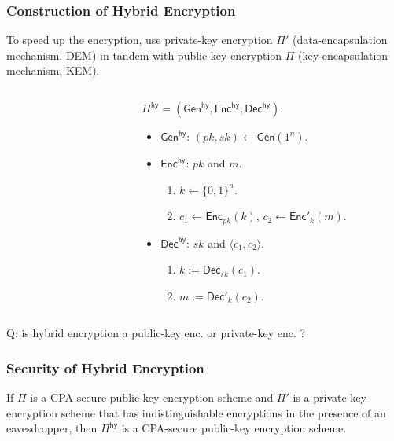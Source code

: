 \begin{frame}\frametitle{Construction of Hybrid Encryption}
To speed up the encryption, use private-key encryption $\Pi'$ (data-encapsulation mechanism, DEM) in tandem with public-key encryption $\Pi$ (key-encapsulation mechanism, KEM).
\begin{columns}
\begin{column}{5cm}
\begin{figure}
\begin{center}

\end{center}
\end{figure}
\end{column}
\begin{column}{5cm}
\begin{construction}
$\Pi^{\mathsf{hy}} = (\mathsf{Gen}^{\mathsf{hy}}, \mathsf{Enc}^{\mathsf{hy}}, \mathsf{Dec}^{\mathsf{hy}})$:
\begin{itemize}
\item $\mathsf{Gen}^{\mathsf{hy}}$: $(pk,sk) \gets \mathsf{Gen}(1^n)$.
\item $\mathsf{Enc}^{\mathsf{hy}}$: $pk$ and $m$. 
\begin{enumerate}
\item $k \gets \{0,1\}^n$.
\item $c_1 \gets \mathsf{Enc}_{pk}(k)$, $c_2 \gets \mathsf{Enc}'_{k}(m)$.
\end{enumerate}
\item $\mathsf{Dec}^{\mathsf{hy}}$: $sk$ and $\langle c_1,c_2\rangle$.
\begin{enumerate}
\item $k := \mathsf{Dec}_{sk}(c_1)$.
\item $m := \mathsf{Dec}'_k(c_2)$.
\end{enumerate}
\end{itemize}
\end{construction}
\end{column}
\end{columns}
\alert{Q: is hybrid encryption a public-key enc. or private-key enc. ?}
\end{frame}
\begin{frame}\frametitle{Security of Hybrid Encryption}
\begin{theorem}
If $\Pi$ is a CPA-secure public-key encryption scheme and $\Pi'$ is a private-key encryption scheme that has indistinguishable encryptions in the presence of an eavesdropper, then $\Pi^{\mathsf{hy}}$ is a CPA-secure public-key encryption scheme.
\end{theorem}
\begin{figure}
\begin{center}

\end{center}
\end{figure}
\end{frame}
